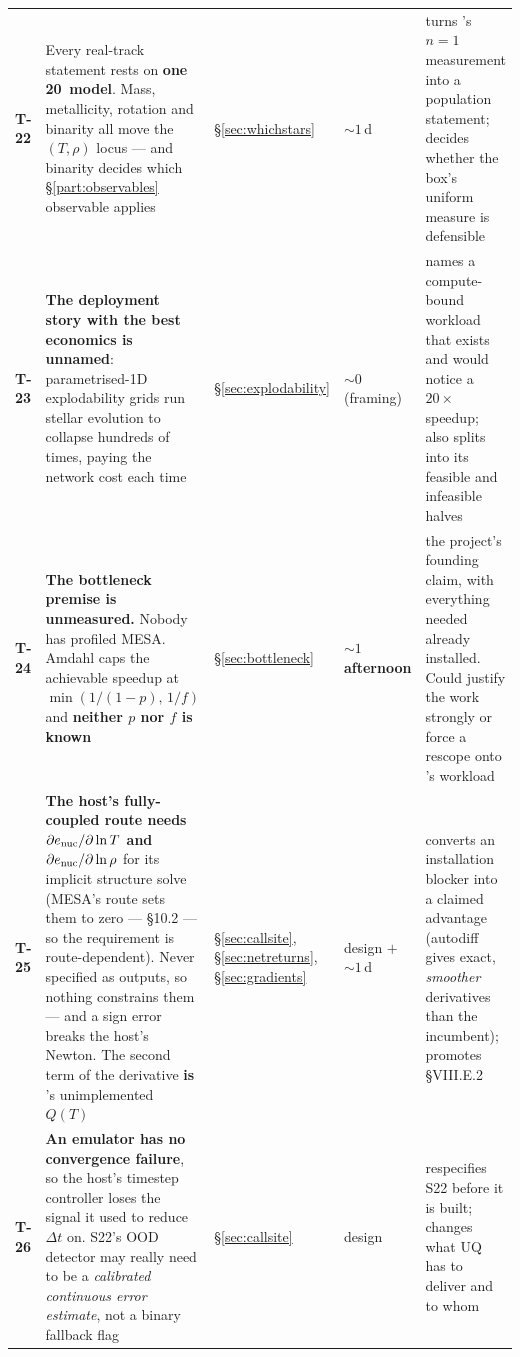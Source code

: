 \begin{longtable}{@{}L{1.0cm} L{6.0cm} L{2.2cm} L{1.7cm} L{4.7cm}@{}}
\textbf{T-22} &
Every real-track statement rests on \textbf{one 20\,\Msun{} model}. Mass,
metallicity, rotation and binarity all move the $(T, \rho)$ locus --- and
binarity decides which \S\ref{part:observables} observable applies &
\S\ref{sec:whichstars} & ${\sim}1$\,d &
turns 's $n = 1$ measurement into a population statement;
decides whether the box's uniform measure is defensible \\

\textbf{T-23} &
\textbf{The deployment story with the best economics is unnamed}:
parametrised-1D explodability grids run stellar evolution to collapse
hundreds of times, paying the network cost each time &
\S\ref{sec:explodability} & ${\sim}0$ (framing) &
names a compute-bound workload that exists and would notice a $20\times$
speedup; also splits  into its feasible and infeasible halves \\

\textbf{T-24} &
\warnglyph{} \textbf{The bottleneck premise is unmeasured.} Nobody has
profiled MESA. Amdahl caps the achievable speedup at $\min(1/(1-p),\,1/f)$
and \textbf{neither $p$ nor $f$ is known} & \S\ref{sec:bottleneck} &
\textbf{${\sim}1$ afternoon} &
the project's founding claim, with everything needed already installed. Could
justify the work strongly or force a rescope onto 's workload \\

\textbf{T-25} &
\warnglyph{} \textbf{The host's fully-coupled route needs
$\partial e_{\mathrm{nuc}}/\partial\ln T$ and $\partial e_{\mathrm{nuc}}/\partial\ln\rho$} for its
implicit structure solve (MESA's  route sets them to
zero --- \citealt{jermyn2023} \S 10.2 --- so the requirement is
route-dependent). Never specified as outputs, so nothing constrains them ---
and a sign error breaks the host's Newton. The second term of the derivative
\textbf{is} 's unimplemented $Q(T)$ &
\S\ref{sec:callsite}, \S\ref{sec:netreturns}, \S\ref{sec:gradients} &
design $+$ ${\sim}1$\,d &
converts an installation blocker into a claimed advantage (autodiff gives
exact, \emph{smoother} derivatives than the incumbent); promotes
\S VIII.E.2 \\

\textbf{T-26} &
\warnglyph{} \textbf{An emulator has no convergence failure}, so the host's
timestep controller loses the signal it used to reduce $\Delta t$ on. S22's
OOD detector may really need to be a \emph{calibrated continuous error
estimate}, not a binary fallback flag & \S\ref{sec:callsite} & design &
respecifies S22 before it is built; changes what UQ has to deliver and to
whom \\


\end{longtable}
